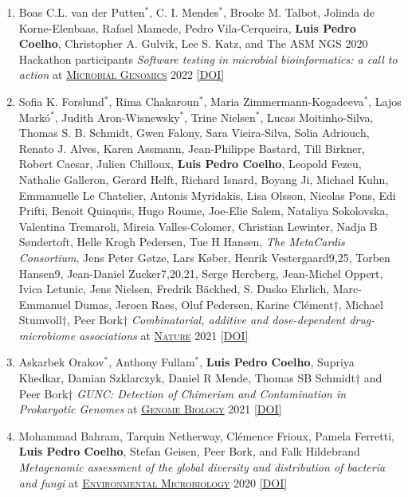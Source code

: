 \documentclass{article}
\newcommand\showdoi[1]{%
    \href{http://dx.doi.org/#1}{[DOI]}%
}
\newcommand\pubname[1]{\textsc{\uline{#1}}}
\newcommand\costar{${}^{*}$}
\newcommand\cosenior{†}
\begin{document}
\begin{enumerate}[resume]
\item Boas C.L. van der Putten\costar, C. I. Mendes\costar, Brooke M. Talbot, Jolinda de Korne-Elenbaas, Rafael Mamede, Pedro Vila-Cerqueira, \textbf{Luis Pedro Coelho},  Christopher A. Gulvik, Lee S. Katz, and The ASM NGS 2020 Hackathon participants \emph{Software testing in microbial bioinformatics: a call to action} at \pubname{Microbial Genomics} 2022 \showdoi{10.1099/mgen.0.000790}

\item Sofia K. Forslund\costar, Rima Chakaroun\costar, Maria
Zimmermann-Kogadeeva\costar, Lajos Markó\costar, Judith Aron-Wisnewsky\costar,
Trine Nielsen\costar, Lucas Moitinho-Silva, Thomas S. B.  Schmidt, Gwen Falony,
Sara Vieira-Silva, Solia Adriouch, Renato J. Alves, Karen Assmann,
Jean-Philippe Bastard, Till Birkner, Robert Caesar, Julien Chilloux,
\textbf{Luis Pedro Coelho}, Leopold Fezeu, Nathalie Galleron, Gerard Helft,
Richard Isnard, Boyang Ji, Michael Kuhn, Emmanuelle Le Chatelier, Antonis
Myridakis, Lisa Olsson, Nicolas Pons, Edi Prifti, Benoit Quinquis, Hugo Roume,
Joe-Elie Salem, Nataliya Sokolovska, Valentina Tremaroli, Mireia
Valles-Colomer, Christian Lewinter, Nadja B Søndertoft, Helle Krogh Pedersen,
Tue H Hansen, \textit{The MetaCardis Consortium}, Jens Peter Gøtze, Lars Køber,
Henrik Vestergaard9,25, Torben Hansen9, Jean-Daniel Zucker7,20,21, Serge
Hercberg, Jean-Michel Oppert, Ivica Letunic, Jens Nielsen, Fredrik Bäckhed, S.
Dusko Ehrlich, Marc-Emmanuel Dumas, Jeroen Raes, Oluf Pedersen, Karine
Clément\cosenior, Michael Stumvoll\cosenior, Peer Bork\cosenior
\emph{Combinatorial, additive and dose-dependent drug- microbiome associations}
at \pubname{Nature} 2021 \showdoi{10.1038/s41586-021-04177-9}

\item Askarbek Orakov\costar, Anthony Fullam\costar, \textbf{Luis Pedro
Coelho}, Supriya Khedkar, Damian Szklarczyk, Daniel R Mende, Thomas SB Schmidt†
and Peer Bork† \emph{GUNC: Detection of Chimerism and Contamination in
Prokaryotic Genomes} at \pubname{Genome Biology} 2021
\showdoi{10.1186/s13059-021-02393-0}

\item Mohammad Bahram, Tarquin Netherway, Clémence Frioux, Pamela Ferretti,
\textbf{Luis Pedro Coelho}, Stefan Geisen, Peer Bork, and Falk Hildebrand
\emph{Metagenomic assessment of the global diversity and distribution of
bacteria and fungi} at \pubname{Environmental Microbiology} 2020
\showdoi{10.1111/1462-2920.15314}


\end{enumerate}
\end{document}
